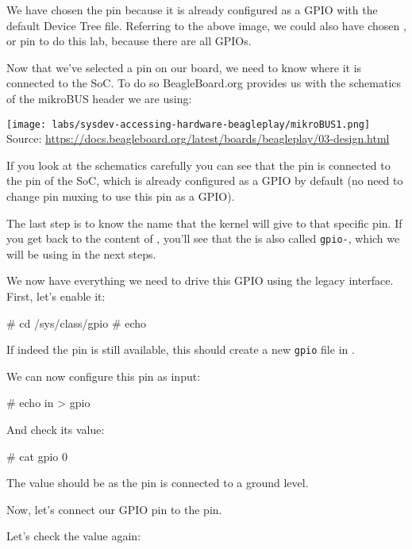 We have chosen the  pin because it is already configured as
a GPIO with the default Device Tree file. Referring to the above
image, we could also have chosen ,  or 
pin to do this lab, because there are all GPIOs.

Now that we've selected a pin on our board, we need to know where it
is connected to the SoC. To do so BeagleBoard.org provides us with the schematics
of the mikroBUS header we are using:

\texttt{[image: labs/sysdev-accessing-hardware-beagleplay/mikroBUS1.png]}
{\small Source: \url{https://docs.beagleboard.org/latest/boards/beagleplay/03-design.html}}

If you look at the schematics carefully you can see that the  pin
is connected to the  pin of the SoC, which is already
configured as a GPIO by default (no need to change pin muxing to use
this pin as a GPIO).

The last step is to know the name that the kernel will give
to that specific pin. If you get back to the content of
, you'll see that the 
is also called {\tt gpio-\gpionum}, which we will be using in the next steps.

We now have everything we need to drive this GPIO using the legacy
interface. First, let's enable it:

\begin{bashinput}
# cd /sys/class/gpio
# echo %
\end{bashinput}

If indeed the pin is still available, this should create a new
{\tt gpio\gpionum} file in .

We can now configure this pin as input:

\begin{bashinput}
# echo in > gpio%
\end{bashinput}

And check its value:

\begin{bashinput}
# cat gpio%
0
\end{bashinput}

The value should be  as the pin is connected to a ground level.

Now, let's connect our GPIO pin to the  pin.

Let's check the value again:

